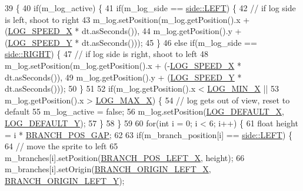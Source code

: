 \begin{DoxyCode}
39                               \{
40     \textcolor{keywordflow}{if}(m\_log\_active) \{
41         \textcolor{keywordflow}{if}(m\_log\_side == \hyperlink{assets_8h_afc015eff6557e84151d2e53b94375445a684d325a7303f52e64011467ff5c5758}{side::LEFT}) \{
42             \textcolor{comment}{// if log side is left, shoot to right}
43             m\_log.setPosition(m\_log.getPosition().x + (\hyperlink{assets_8h_aa54f2f4f3c4c2ef6118b0aee2d30b7a9}{LOG\_SPEED\_X} * dt.asSeconds()),
44                               m\_log.getPosition().y + (\hyperlink{assets_8h_a963e90795637e85827a228a1ae13a979}{LOG\_SPEED\_Y} * dt.asSeconds()));
45         \}
46         \textcolor{keywordflow}{else} \textcolor{keywordflow}{if}(m\_log\_side == \hyperlink{assets_8h_afc015eff6557e84151d2e53b94375445a21507b40c80068eda19865706fdc2403}{side::RIGHT}) \{
47             \textcolor{comment}{// if log side is right, shoot to left}
48             m\_log.setPosition(m\_log.getPosition().x + (-\hyperlink{assets_8h_aa54f2f4f3c4c2ef6118b0aee2d30b7a9}{LOG\_SPEED\_X} * dt.asSeconds()),
49                               m\_log.getPosition().y + (\hyperlink{assets_8h_a963e90795637e85827a228a1ae13a979}{LOG\_SPEED\_Y} * dt.asSeconds()));
50         \}
51 
52         \textcolor{keywordflow}{if}(m\_log.getPosition().x < \hyperlink{assets_8h_a893416b56a26dbf242ba94aa8e29077f}{LOG\_MIN\_X} ||
53            m\_log.getPosition().x > \hyperlink{assets_8h_aa41153c35d59d767853cf191f94cb4aa}{LOG\_MAX\_X}) \{
54             \textcolor{comment}{// log gets out of view, reset to default}
55             m\_log\_active = \textcolor{keyword}{false};
56             m\_log.setPosition(\hyperlink{assets_8h_ae6dc3cb1360c56d5ced03e209c167246}{LOG\_DEFAULT\_X}, \hyperlink{assets_8h_af03867adeb41793ca8058f77fa8fcb23}{LOG\_DEFAULT\_Y});
57         \}
58     \}
59     
60     \textcolor{keywordflow}{for}(\textcolor{keywordtype}{int} i = 0; i < 6; i++) \{
61         \textcolor{keywordtype}{float} height = i * \hyperlink{assets_8h_a42e8c152dd776e62a74ad4d3b13e997e}{BRANCH\_POS\_GAP};
62 
63         \textcolor{keywordflow}{if}(m\_branch\_position[i] == \hyperlink{assets_8h_afc015eff6557e84151d2e53b94375445a684d325a7303f52e64011467ff5c5758}{side::LEFT}) \{
64             \textcolor{comment}{// move the sprite to left}
65             m\_branches[i].setPosition(\hyperlink{assets_8h_ae1c4957dbb3e0737cfa720e0249af5cb}{BRANCH\_POS\_LEFT\_X}, height);
66             m\_branches[i].setOrigin(\hyperlink{assets_8h_a0f5789c7cbfdbb77c53106eba31742ca}{BRANCH\_ORIGIN\_LEFT\_X}, 
      \hyperlink{assets_8h_a09312af5ad4d9c74a8b09aaaea07e733}{BRANCH\_ORIGIN\_LEFT\_Y});

\end{DoxyCode}
